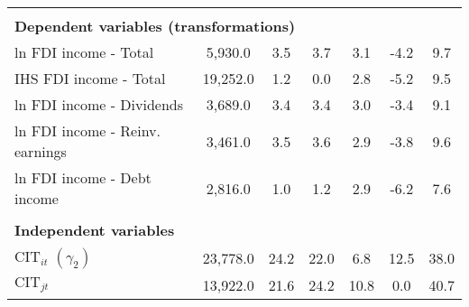 \documentclass[twoside,a4paper,11pt]{article}
\begin{document}
\begin{minipage}{\linewidth}
{\begin{tabular}{lccc|ccc}
		\vspace{2pt} & \begin{footnotesize}\end{footnotesize} & \begin{footnotesize}\end{footnotesize} & \begin{footnotesize}\end{footnotesize} & \begin{footnotesize}\end{footnotesize} & \begin{footnotesize}\end{footnotesize} & \begin{footnotesize}\end{footnotesize} \\
\multicolumn{7}{l}{\textbf{Dependent variables (transformations)}} \\\hline
		ln FDI income - Total & 5,930.0 & 3.5 & 3.7 & 3.1 & -4.2 & 9.7 \\
		IHS FDI income - Total & 19,252.0 & 1.2 & 0.0 & 2.8 & -5.2 & 9.5 \\
		ln FDI income - Dividends & 3,689.0 & 3.4 & 3.4 & 3.0 & -3.4 & 9.1 \\
		ln FDI income - Reinv. earnings & 3,461.0 & 3.5 & 3.6 & 2.9 & -3.8 & 9.6 \\
		ln FDI income - Debt income & 2,816.0 & 1.0 & 1.2 & 2.9 & -6.2 & 7.6 \\
		\vspace{2pt} & \begin{footnotesize}\end{footnotesize} & \begin{footnotesize}\end{footnotesize} & \begin{footnotesize}\end{footnotesize} & \begin{footnotesize}\end{footnotesize} & \begin{footnotesize}\end{footnotesize} & \begin{footnotesize}\end{footnotesize} \\
\multicolumn{7}{l}{\textbf{Independent variables}} \\\hline
		$ \text{CIT}_{it}$ $(\gamma_2)$ & 23,778.0 & 24.2 & 22.0 & 6.8 & 12.5 & 38.0 \\
		$ \text{CIT}_{jt}$ & 13,922.0 & 21.6 & 24.2 & 10.8 & 0.0 & 40.7 \\

\end{tabular}}
\end{minipage}
\end{document}
